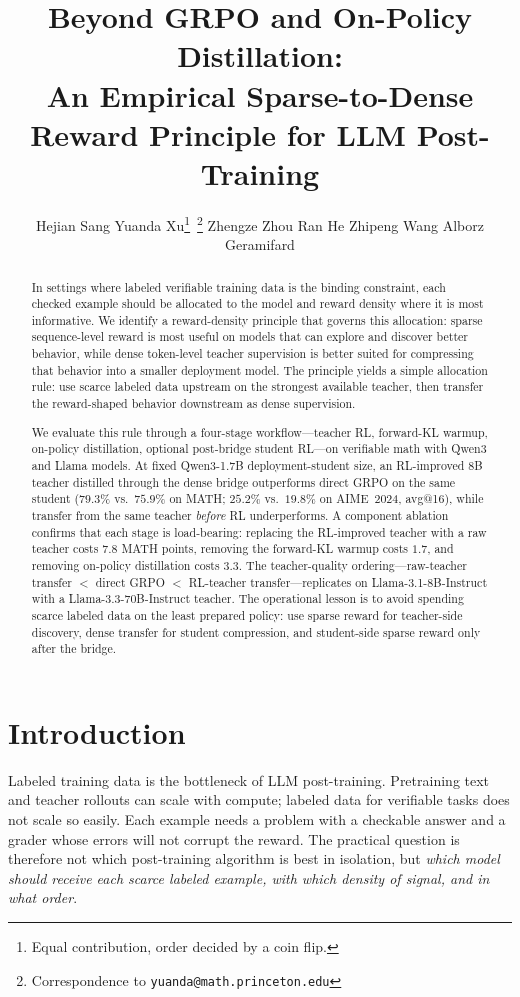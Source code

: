 \documentclass{article}
\title{Beyond GRPO and On-Policy Distillation: \\
An Empirical Sparse-to-Dense Reward Principle for LLM Post-Training}
\author{
    Hejian Sang\footnotemark[1] \quad
    Yuanda Xu\thanks{Equal contribution, order decided by a coin flip.}\,
    \thanks{Correspondence to \texttt{yuanda@math.princeton.edu}} \quad
    Zhengze Zhou\footnotemark[1] \quad
    Ran He\footnotemark[1] \quad
    Zhipeng Wang \quad
    Alborz Geramifard
}
\begin{document}
\maketitle

\begin{abstract}
In settings where labeled verifiable training data is the binding constraint, each checked example should be allocated to the model and reward density where it is most informative. We identify a reward-density principle that governs this allocation: sparse sequence-level reward is most useful on models that can explore and discover better behavior, while dense token-level teacher supervision is better suited for compressing that behavior into a smaller deployment model. The principle yields a simple allocation rule: use scarce labeled data upstream on the strongest available teacher, then transfer the reward-shaped behavior downstream as dense supervision.

We evaluate this rule through a four-stage workflow---teacher RL, forward-KL warmup, on-policy distillation, optional post-bridge student RL---on verifiable math with Qwen3 and Llama models. At fixed Qwen3-1.7B deployment-student size, an RL-improved 8B teacher distilled through the dense bridge outperforms direct GRPO on the same student ($79.3\%$ vs.\ $75.9\%$ on MATH; $25.2\%$ vs.\ $19.8\%$ on AIME~2024, avg@16), while transfer from the same teacher \emph{before} RL underperforms. A component ablation confirms that each stage is load-bearing: replacing the RL-improved teacher with a raw teacher costs $7.8$ MATH points, removing the forward-KL warmup costs $1.7$, and removing on-policy distillation costs $3.3$. The teacher-quality ordering---raw-teacher transfer $<$ direct GRPO $<$ RL-teacher transfer---replicates on Llama-3.1-8B-Instruct with a Llama-3.3-70B-Instruct teacher. The operational lesson is to avoid spending scarce labeled data on the least prepared policy: use sparse reward for teacher-side discovery, dense transfer for student compression, and student-side sparse reward only after the bridge.
\end{abstract}

\section{Introduction}
\label{sec:intro}

Labeled training data is the bottleneck of LLM post-training. Pretraining text and teacher rollouts can scale with compute; labeled data for verifiable tasks does not scale so easily. Each example needs a problem with a checkable answer and a grader whose errors will not corrupt the reward. The practical question is therefore not which post-training algorithm is best in isolation, but \emph{which model should receive each scarce labeled example, with which density of signal, and in what order}.
\end{document}
